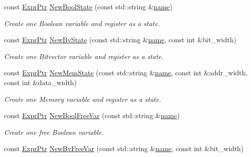 \begin{DoxyCompactItemize}
const \mbox{\hyperlink{namespaceilang_a7c4196c72e53ea4df4b7861af7bc3bce}{Expr\+Ptr}} \mbox{\hyperlink{classilang_1_1_instr_lvl_abs_a7ccfca0eb52e4700f4e28a29df37ea47}{New\+Bool\+State}} (const std\+::string \&\mbox{\hyperlink{classilang_1_1_object_acf20b072e69f572910d7d80c93af0b38}{name}})
\begin{DoxyCompactList}\small\item\em Create one Boolean variable and register as a state. \end{DoxyCompactList}\item 
const \mbox{\hyperlink{namespaceilang_a7c4196c72e53ea4df4b7861af7bc3bce}{Expr\+Ptr}} \mbox{\hyperlink{classilang_1_1_instr_lvl_abs_aa955d8adb360f8b8025cb5960861970e}{New\+Bv\+State}} (const std\+::string \&\mbox{\hyperlink{classilang_1_1_object_acf20b072e69f572910d7d80c93af0b38}{name}}, const int \&bit\+\_\+width)
\begin{DoxyCompactList}\small\item\em Create one Bitvector variable and register as a state. \end{DoxyCompactList}\item 
const \mbox{\hyperlink{namespaceilang_a7c4196c72e53ea4df4b7861af7bc3bce}{Expr\+Ptr}} \mbox{\hyperlink{classilang_1_1_instr_lvl_abs_af9cfdcf49186d4a33ae50c9c48fabd44}{New\+Mem\+State}} (const std\+::string \&\mbox{\hyperlink{classilang_1_1_object_acf20b072e69f572910d7d80c93af0b38}{name}}, const int \&addr\+\_\+width, const int \&data\+\_\+width)
\begin{DoxyCompactList}\small\item\em Create one Memory variable and register as a state. \end{DoxyCompactList}\item 
const \mbox{\hyperlink{namespaceilang_a7c4196c72e53ea4df4b7861af7bc3bce}{Expr\+Ptr}} \mbox{\hyperlink{classilang_1_1_instr_lvl_abs_a330e24d4208d1f7bcf9b4f4ad314eaf4}{New\+Bool\+Free\+Var}} (const std\+::string \&\mbox{\hyperlink{classilang_1_1_object_acf20b072e69f572910d7d80c93af0b38}{name}})
\begin{DoxyCompactList}\small\item\em Create one free Boolean variable. \end{DoxyCompactList}\item 
const \mbox{\hyperlink{namespaceilang_a7c4196c72e53ea4df4b7861af7bc3bce}{Expr\+Ptr}} \mbox{\hyperlink{classilang_1_1_instr_lvl_abs_af2bc2d00955d5ce5322abeddb4d8324f}{New\+Bv\+Free\+Var}} (const std\+::string \&\mbox{\hyperlink{classilang_1_1_object_acf20b072e69f572910d7d80c93af0b38}{name}}, const int \&bit\+\_\+width)

\end{DoxyCompactItemize}
